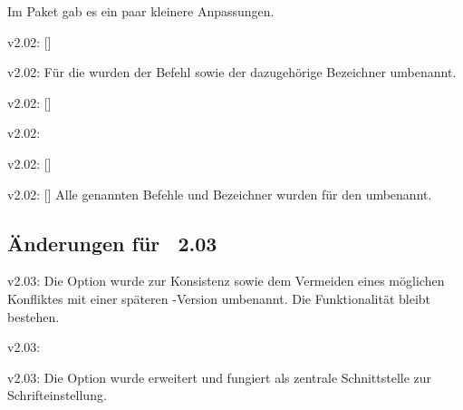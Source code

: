 Im Paket  gab es ein paar kleinere Anpassungen.
\begin{Bundle}{}
\begin{Obsolete}{v2.02:}{%
  []%
}
\begin{Obsolete}{v2.02:}{}
\printobsoletelist%
%
Für die \taskname{} wurden der Befehl sowie der dazugehörige Bezeichner 
umbenannt.
\end{Obsolete}
\end{Obsolete}

\begin{Obsolete}{v2.02:}{%
  []%
}
\begin{Obsolete}{v2.02:}{}
\begin{Obsolete}{v2.02:}{%
  []%
}
\begin{Obsolete}{v2.02:}{%
  []%
}
\printobsoletelist%
%
Alle genannten Befehle und Bezeichner wurden für den \noticename{} umbenannt.
\end{Obsolete}
\end{Obsolete}
\end{Obsolete}
\end{Obsolete}
\end{Bundle}


%
\subsection{Änderungen für \TUDScript~2.03}
\begin{Obsolete}{v2.03:}{}
\printobsoletelist%
%
Die Option  wurde zur Konsistenz sowie dem Vermeiden 
eines möglichen Konfliktes mit einer späteren \KOMAScript-Version umbenannt. 
Die Funktionalität bleibt bestehen.
\end{Obsolete}

\begin{Obsolete}{v2.03:}{}
\begin{Obsolete}{v2.03:}{}
\printobsoletelist%
%
Die Option  wurde erweitert und fungiert als zentrale 
Schnittstelle zur Schrifteinstellung. 
\end{Obsolete}
\end{Obsolete}

